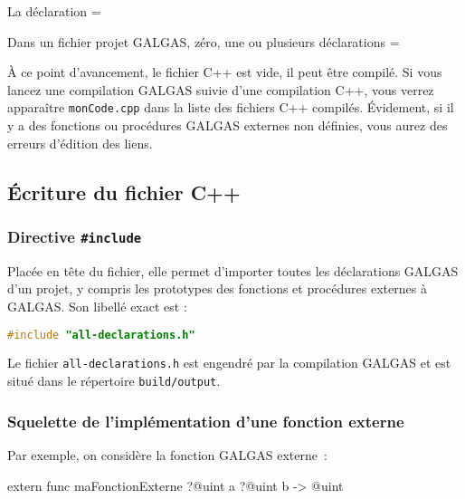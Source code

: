 La déclaration \ggs=%

Dans un fichier projet GALGAS, zéro, une ou plusieurs déclarations \ggs=%

À ce point d'avancement, le fichier C++ est vide, il peut être compilé. Si vous lancez une compilation GALGAS suivie d'une compilation C++, vous verrez apparaître \texttt{monCode.cpp} dans la liste des fichiers C++ compilés. Évidement, si il y a des fonctions ou procédures GALGAS externes non définies, vous aurez des erreurs d'édition des liens.





\subsection{Écriture du fichier C++}


\subsubsection{Directive \texttt{\#include}}

Placée en tête du fichier, elle permet d'importer toutes les déclarations GALGAS d'un projet, y compris les prototypes des fonctions et procédures externes à GALGAS. Son libellé exact est :

\begin{lstlisting}[language=C++]
#include "all-declarations.h"
\end{lstlisting}

Le fichier \texttt{all-declarations.h} est engendré par la compilation GALGAS et est situé dans le répertoire \texttt{build/output}.



\subsubsection{Squelette de l'implémentation d'une fonction externe}

Par exemple, on considère la fonction GALGAS externe~:
\begin{galgas}
extern func maFonctionExterne ?@uint a ?@uint b -> @uint 
\end{galgas}

